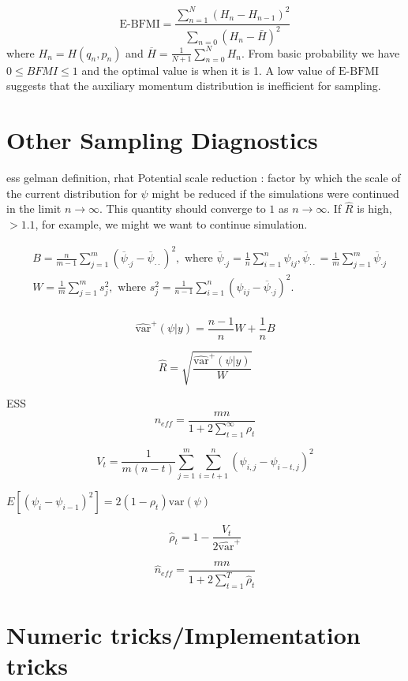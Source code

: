 \documentclass[]{report}
\begin{document}
\[ \text{E-BFMI} = \frac{\sum_{n=1}^N(H_n-H_{n-1})^2}{\sum_{n=0}(H_n-\bar{H})^2} \]
where $H_n = H(q_n,p_n)$ and $\overline{H}=\frac{1}{N+1}\sum_{n=0}^N H_n$. From basic
probability we have $0 \le BFMI \le 1 $ and the optimal value is when it is
1. A low value of $\text{E-BFMI}$ suggests that the auxiliary momentum distribution is
inefficient for sampling. 

 
\section{Other Sampling Diagnostics}
ess gelman definition, rhat 
Potential scale reduction : factor by which the scale of the current distribution for $\psi$ might be reduced if the simulations were continued in the limit $n \rightarrow \infty$. This quantity should converge to $1$ as $n \rightarrow \infty$. If $\hat{R}$ is high, $ > 1.1 $, for example, we might we want to continue simulation. 

\begin{align*}
&B = \frac{n}{m-1} \sum_{j=1}^{m}(\overline{\psi}_{\cdot j} - \overline{\psi}_{\cdot \cdot})^2, \text{ where } 
\overline{\psi}_{\cdot j} = \frac{1}{n} \sum_{i=1}^n \psi_{ij} , \overline{\psi}_{\cdot \cdot} = \frac{1}{m} \sum_{j=1}^m \overline{\psi}_{\cdot j }
 \\
&W = \frac{1}{m} \sum_{j=1}^m s_j^2 , \text{ where }
s_j^2 = \frac{1}{n-1} \sum_{i=1}^n (\psi_{ij} - \overline{\psi}_{\cdot j } )^2.\\
\end{align*}

\[ \hat{\text{var}}^+(\psi|y) = \frac{n-1}{n} W + \frac{1}{n} B \]

\[\hat{R} = \sqrt{\frac{\hat{\text{var}}^+(\psi|y)}{W}} \]

ESS 
\[n_{eff}  = \frac{mn}{1 + 2 \sum_{t=1}^\infty \rho_t} \]

\[V_t = \frac{1}{m(n-t)} \sum_{j=1}^m \sum_{i=t+1}^n (\psi_{i,j} - \psi_{i-t,j})^2 \]

$E[(\psi_i - \psi_{i-1})^2] = 2(1-\rho_t)\text{var}(\psi)$

\[\hat{\rho}_t = 1 - \frac{V_t}{2 \hat{\text{var}}^+}\]


\[\hat{n}_{eff} = \frac{mn}{1 + 2 \sum_{t=1}^T \hat{\rho}_t} \]
 


\section{Numeric tricks/Implementation tricks}
\end{document}
